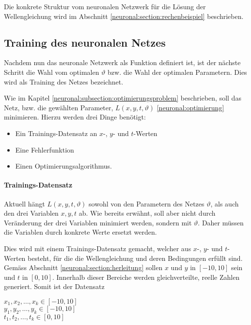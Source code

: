 Die konkrete Struktur vom neuronalen Netzwerk für die Lösung der Wellengleichung wird im Abschnitt \ref{neuronal:section:rechenbeispiel} beschrieben.


\subsection{Training des neuronalen Netzes}\label{neuronal:subsection:training_nn}

Nachdem nun das neuronale Netzwerk als Funktion definiert ist, ist der nächste Schritt die Wahl vom optimalen \( \vartheta \) bzw. die Wahl der optimalen Parametern.
Dies wird als Training des Netzes bezeichnet.

Wie im Kapitel \ref{neuronal:subsection:optimierungsproblem} beschrieben, soll das Netz, bzw. die gewählten Parameter, \( L(x, y, t, \vartheta) \) \eqref{neuronal:optimierung} minimieren.
Hierzu werden drei Dinge benötigt:
\begin{itemize}
    \item Ein Trainings-Datensatz an \( x \)-, \( y \)- und \( t \)-Werten
    \item Eine Fehlerfunktion
    \item Einen Optimierungsalgorithmus.
\end{itemize}

\paragraph{Trainings-Datensatz}

Aktuell hängt \( L(x, y, t, \vartheta) \) sowohl von den Parametern des Netzes \( \vartheta \), als auch den drei Variablen \( x, y, t \) ab.
Wie bereits erwähnt, soll aber nicht durch Veränderung der drei Variablen minimiert werden, sondern mit \( \vartheta \).
Daher müssen die Variablen durch konkrete Werte ersetzt werden.

Dies wird mit einem Trainings-Datensatz gemacht, welcher aus \( x \)-, \( y \)- und \( t \)-Werten besteht, für die die Wellengleichung und deren Bedingungen erfüllt sind.
Gemäss Abschnitt \ref{neuronal:section:herleitung} sollen \( x \) und \( y \) in \( [-10,10] \) sein und \( t \) in \( [0,10] \).
Innerhalb dieser Bereiche werden gleichverteilte, reelle Zahlen generiert.
Somit ist der Datensatz
\begin{center}
    \( x_1, x_2, \ldots, x_k \in [-10,10] \)\\
    \( y_1, y_2, \ldots, y_k \in [-10,10] \)\\
    \( t_1, t_2, \ldots, t_k \in [0,10] \)\\
\end{center}

